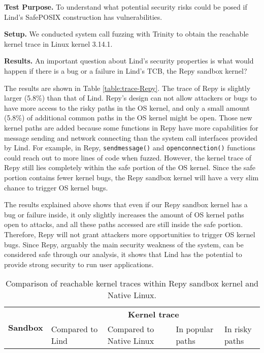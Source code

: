 {{\textbf{Test Purpose.}
To understand what potential security risks could be posed if Lind's SafePOSIX construction
has vulnerabilities.

\noindent
\textbf{Setup.}
We conducted system call fuzzing with Trinity
to obtain the reachable kernel trace in Linux kernel 3.14.1.

\noindent
\textbf{Results.}
An important question about Lind's security properties is what would happen if there is a bug or a failure in Lind's TCB,
the Repy sandbox kernel?

The results are shown in Table \ref{table:trace-Repy}. The trace of Repy is
slightly larger (5.8\%) than that of Lind.
Repy's design can not allow attackers or bugs to
have more access to the risky paths in the OS kernel, and only a small amount (5.8\%) of
additional common paths in the OS kernel might be open.
Those new kernel paths are added because some functions in Repy
have more capabilities for message sending and network connecting than the system call interfaces
provided by Lind. For example, in Repy,
\texttt{sendmessage()} and \texttt{openconnection()}
functions could reach out to more lines of code when fuzzed. However, the kernel
 trace of Repy still lies completely within the safe
portion of the OS kernel.
Since the safe portion contains fewer kernel bugs, the Repy sandbox kernel
will have a very slim chance to trigger OS kernel bugs.

The results explained above shows that even if our Repy sandbox kernel has a
bug or failure inside,
it only slightly increases the amount of OS kernel paths open to attacks,
and all these paths accessed are still inside the safe portion.
Therefore, Repy will not grant attackers more opportunities to trigger OS
kernel bugs.
Since Repy, arguably the main security weakness of the system, can be
considered safe through our analysis,
it shows that Lind has the potential to provide strong security to run user applications.

\begin{table}
\centering
\scriptsize
\caption{\small Comparison of reachable kernel traces within Repy sandbox kernel and Native Linux.}
\begin{tabular}{|l|l|l|l|l|}
  \hline
  \multirow{3}{.8cm}{\bf Sandbox} & \multicolumn{4}{c|}{\bf Kernel trace} \\ \cline{2-5}
  & \multirow{2}{1cm}{Compared to Lind} &
  \multirow{2}{1.3cm}{Compared to Native Linux} & \multirow{2}{1.5cm}{In popular paths} &
  \multirow{2}{1.0cm}{In risky paths} \\
  & & & & \\  \hline


\end{tabular}
\end{table}}}
